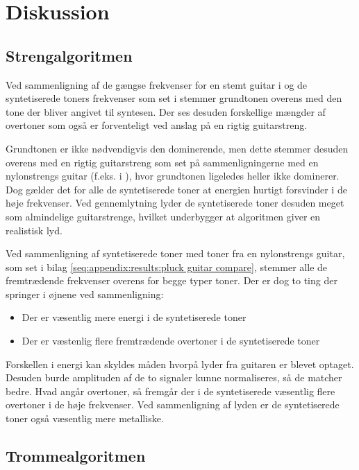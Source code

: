 \section{Diskussion}

\subsection{Strengalgoritmen}

Ved sammenligning af de gængse frekvenser for en stemt guitar i  og de syntetiserede toners frekvenser som set i  stemmer grundtonen overens med den tone der bliver angivet til syntesen.
Der ses desuden forskellige mængder af overtoner som også er forventeligt ved anslag på en rigtig guitarstreng.

Grundtonen er ikke nødvendigvis den dominerende, men dette stemmer desuden overens med en rigtig guitarstreng som set på sammenligningerne med en nylonstrengs guitar (f.eks. i ), hvor grundtonen ligeledes heller ikke dominerer.
Dog gælder det for alle de syntetiserede toner at energien hurtigt forsvinder i de høje frekvenser.
Ved gennemlytning lyder de syntetiserede toner desuden meget som almindelige guitarstrenge, hvilket underbygger at algoritmen giver en realistisk lyd.

Ved sammenligning af syntetiserede toner med toner fra en nylonstrengs guitar, som set i bilag \ref{seq:appendix:results:pluck guitar compare}, stemmer alle de fremtrædende frekvenser overens for begge typer toner.
Der er dog to ting der springer i øjnene ved sammenligning:

\begin{itemize}
  \item Der er væsentlig mere energi i de syntetiserede toner
  \item Der er væstenlig flere fremtrædende overtoner i de syntetiserede toner
\end{itemize}

Forskellen i energi kan skyldes måden hvorpå lyder fra guitaren er blevet optaget. Desuden burde amplituden af de to signaler kunne normaliseres, så de matcher bedre.
Hvad angår overtoner, så fremgår der i de syntetiserede væsentlig flere overtoner i de høje frekvenser.
Ved sammenligning af lyden er de syntetiserede toner også væsentlig mere metalliske.

\subsection{Trommealgoritmen}

